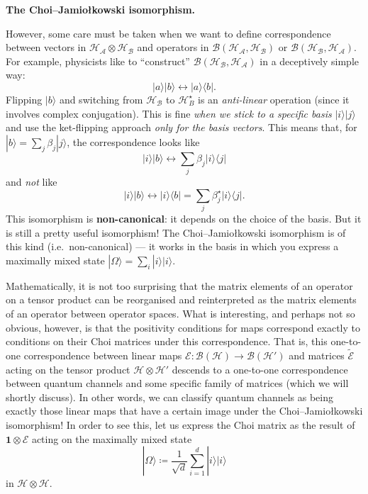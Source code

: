 \documentclass[fleqn,a4paper]{article}
\newenvironment{technical}[1]{\textbf{#1.}\par\vspace{.5\baselineskip}\everypar{\setlength{\parindent}{1.5em}}}{}
\theoremstyle{definition}
\theoremstyle{definition}
\theoremstyle{definition}
\theoremstyle{definition}
\theoremstyle{remark}
\begin{document}
\begin{technical}{The Choi--Jamiołkowski isomorphism}
However, some care must be taken when we want to define correspondence between vectors in \(\mathcal{H}_{\mathcal{A}}\otimes\mathcal{H}_{\mathcal{B}}\) and operators in \(\mathscr{B}(\mathcal{H}_{\mathcal{A}},\mathcal{H}_{\mathcal{B}})\) or \(\mathscr{B}(\mathcal{H}_{\mathcal{B}},\mathcal{H}_{\mathcal{A}})\).
For example, physicists like to ``construct'' \(\mathscr{B}(\mathcal{H}_{\mathcal{B}},\mathcal{H}_{\mathcal{A}})\) in a deceptively simple way:
\[
  |a\rangle|b\rangle \longleftrightarrow |a\rangle\langle b|.
\]
Flipping \(|b\rangle\) and switching from \(\mathcal{H}_{\mathcal{B}}\) to \(\mathcal{H}^\star_B\) is an \emph{anti-linear} operation (since it involves complex conjugation).
This is fine \emph{when we stick to a specific basis} \(|i\rangle|j\rangle\) and use the ket-flipping approach \emph{only for the basis vectors}.
This means that, for \(|b\rangle=\sum_j\beta_j|j\rangle\), the correspondence looks like
\[
  |i\rangle|b\rangle \longleftrightarrow \sum_j \beta_j |i\rangle\langle j|
\]
and \emph{not} like
\[
  |i\rangle|b\rangle \longleftrightarrow |i\rangle\langle b|
  = \sum_j \beta^\star_j |i\rangle\langle j|.
\]
This isomorphism is \textbf{non-canonical}: it depends on the choice of the basis.
But it is still a pretty useful isomorphism!
The Choi--Jamiołkowski isomorphism is of this kind (i.e.~non-canonical) --- it works in the basis in which you express a maximally mixed state \(|\Omega\rangle=\sum_i|i\rangle|i\rangle\).

\end{technical}

Mathematically, it is not too surprising that the matrix elements of an operator on a tensor product can be reorganised and reinterpreted as the matrix elements of an operator between operator spaces.
What is interesting, and perhaps not so obvious, however, is that the positivity conditions for maps correspond exactly to conditions on their Choi matrices under this correspondence.
That is, this one-to-one correspondence between linear maps \(\mathcal{E}\colon\mathcal{B}(\mathcal{H})\to\mathcal{B}(\mathcal{H}')\) and matrices \(\widetilde{\mathcal{E}}\) acting on the tensor product \(\mathcal{H}\otimes\mathcal{H}'\) descends to a one-to-one correspondence between quantum channels and some specific family of matrices (which we will shortly discuss).
In other words, we can classify quantum channels as being exactly those linear maps that have a certain image under the Choi--Jamiołkowski isomorphism!
In order to see this, let us express the Choi matrix as the result of \(\mathbf{1}\otimes\mathcal{E}\) acting on the maximally mixed state
\[
  |\Omega\rangle\coloneqq\frac{1}{\sqrt{d}}\sum_{i=1}^d|i\rangle|i\rangle
\]
in \(\mathcal{H}\otimes\mathcal{H}\).
\end{document}
